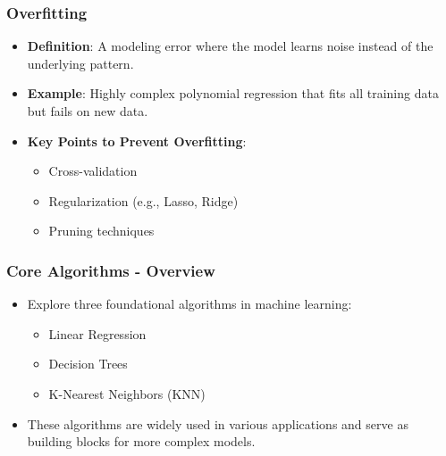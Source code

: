 \documentclass[aspectratio=169]{beamer}
\begin{document}
\begin{frame}[fragile]
    \frametitle{Overfitting}
    \begin{itemize}
        \item \textbf{Definition}: 
            A modeling error where the model learns noise instead of the underlying pattern.
        \item \textbf{Example}: 
            Highly complex polynomial regression that fits all training data but fails on new data.
        \item \textbf{Key Points to Prevent Overfitting}:
            \begin{itemize}
                \item Cross-validation
                \item Regularization (e.g., Lasso, Ridge)
                \item Pruning techniques
            \end{itemize}
    \end{itemize}
\end{frame}

\begin{frame}[fragile]
    \frametitle{Core Algorithms - Overview}
    \begin{itemize}
        \item Explore three foundational algorithms in machine learning:
        \begin{itemize}
            \item Linear Regression
            \item Decision Trees
            \item K-Nearest Neighbors (KNN)
        \end{itemize}
        \item These algorithms are widely used in various applications and serve as building blocks for more complex models.
    \end{itemize}
\end{frame}
\end{document}
